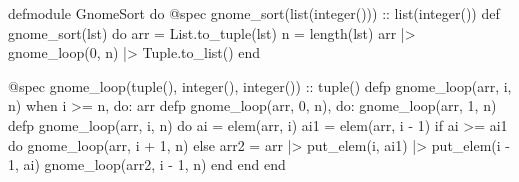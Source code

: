 defmodule GnomeSort do
  @spec gnome_sort(list(integer())) :: list(integer())
  def gnome_sort(lst) do
    arr = List.to_tuple(lst)
    n = length(lst)
    arr |> gnome_loop(0, n) |> Tuple.to_list()
  end

  @spec gnome_loop(tuple(), integer(), integer()) :: tuple()
  defp gnome_loop(arr, i, n) when i >= n, do: arr
  defp gnome_loop(arr, 0, n), do: gnome_loop(arr, 1, n)
  defp gnome_loop(arr, i, n) do
    ai  = elem(arr, i)
    ai1 = elem(arr, i - 1)
    if ai >= ai1 do
      gnome_loop(arr, i + 1, n)
    else
      arr2 = arr |> put_elem(i, ai1) |> put_elem(i - 1, ai)
      gnome_loop(arr2, i - 1, n)
    end
  end
end
